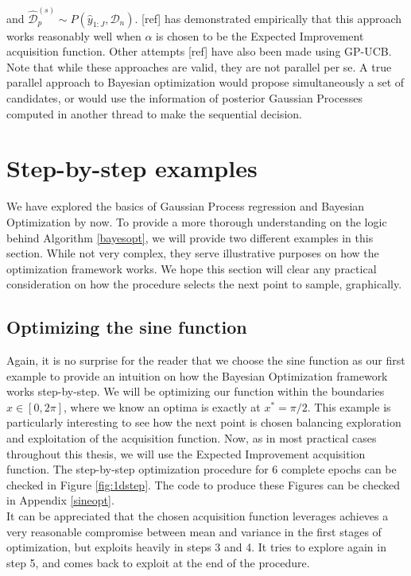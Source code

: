 \documentclass[10pt,a4paper,twoside]{book}
\begin{document}
and $\hat{\mathcal{D}}_p^{(s)} \sim P(\hat{y}_{1:J}, \mathcal{D}_n)$. [ref] has demonstrated empirically that this approach works reasonably well when $\alpha$ is chosen to be the Expected Improvement acquisition function. Other attempts [ref] have also been made using GP-UCB. Note that while these approaches are valid, they are not parallel per se. A true parallel approach to Bayesian optimization would propose simultaneously a set of candidates, or would use the information of posterior Gaussian Processes computed in another thread to make the sequential decision. 


\section{Step-by-step examples}

We have explored the basics of Gaussian Process regression and Bayesian Optimization by now. To provide a more thorough understanding on the logic behind Algorithm \ref{bayesopt}, we will provide two different examples in this section. While not very complex, they serve illustrative purposes on how the optimization framework works. We hope this section will clear any practical consideration on how the procedure selects the next point to sample, graphically.

\subsection{Optimizing the sine function}

Again, it is no surprise for the reader that we choose the sine function as our first example to provide an intuition on how the Bayesian Optimization framework works step-by-step. We will be optimizing our function within the boundaries $x \in [0, 2\pi]$, where we know an optima is exactly at $x^* = \pi/2$. This example is particularly interesting to see how the next point is chosen balancing exploration and exploitation of the acquisition function. Now, as in most practical cases throughout this thesis, we will use the Expected Improvement acquisition function. The step-by-step optimization procedure for 6 complete epochs can be checked in Figure \ref{fig:1dstep}. The code to produce these Figures can be checked in Appendix \ref{sineopt}.\\

It can be appreciated that the chosen acquisition function leverages achieves a very reasonable compromise between mean and variance in the first stages of optimization, but exploits heavily in steps 3 and 4. It tries to explore again in step 5, and comes back to exploit at the end of the procedure.
\end{document}
